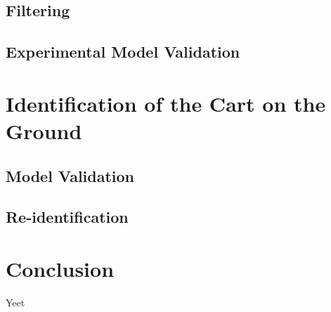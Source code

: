 \documentclass[a4paper,kul]{kulakarticle} %
\begin{document}
\subsection{Filtering}


\subsection{Experimental Model Validation}


\section{Identification of the Cart on the Ground}


\subsection{Model Validation}


\subsection{Re-identification}












\section*{Conclusion}
Yeet
\end{document}
